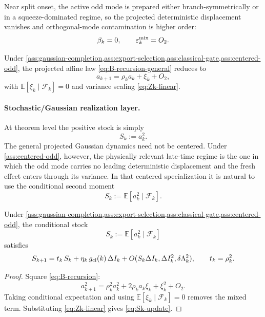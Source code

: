 \begin{assumption}
\label{ass:centered-odd}
Near split onset, the active odd mode is prepared either branch-symmetrically or in a squeeze-dominated regime, so the
projected deterministic displacement vanishes and orthogonal-mode contamination is higher order:
\[
\beta_k=0,
\qquad
\varepsilon_k^{\rm mix}=O_2.
\]
\end{assumption}

\begin{corollary}
\label{cor:centered-odd-mode}
Under
\cref{ass:gaussian-completion,ass:export-selection,ass:classical-gate,ass:centered-odd},
the projected affine law \eqref{eq:B-recursion-general} reduces to
\begin{equation}
a_{k+1}=\rho_k a_k+\xi_k+O_2,
\label{eq:B-recursion}
\end{equation}
with \(\mathbb E[\xi_k\mid\mathcal F_k]=0\) and variance scaling \eqref{eq:Zk-linear}.
\end{corollary}

\paragraph{Stochastic/Gaussian realization layer.}
At theorem level the positive stock is simply
\[
S_k:=a_k^2.
\]
The general projected Gaussian dynamics need not be centered.
Under \cref{ass:centered-odd}, however, the physically relevant late-time regime is the one in which the odd mode carries no
leading deterministic displacement and the fresh effect enters through its variance.
In that centered specialization it is natural to use the conditional second moment
\[
S_k:=\mathbb E[a_k^2\mid\mathcal F_k].
\]

\begin{proposition}
\label{prop:odd-mode-stock}
Under
\cref{ass:gaussian-completion,ass:export-selection,ass:classical-gate,ass:centered-odd},
the conditional stock
\[
S_k:=\mathbb E[a_k^2\mid\mathcal F_k]
\]
satisfies
\begin{equation}
S_{k+1}
=
t_k\,S_k+\eta_k\,g_{\rm cl}(k)\,\Delta I_k
+O(S_k\Delta I_k,\Delta I_k^2,\delta\Lambda_k^2),
\qquad t_k=\rho_k^2.
\label{eq:Sk-update}
\end{equation}
\end{proposition}

\begin{proof}
Square \eqref{eq:B-recursion}:
\[
a_{k+1}^2=\rho_k^2 a_k^2+2\rho_k a_k\xi_k+\xi_k^2+O_2.
\]
Taking conditional expectation and using \(\mathbb E[\xi_k\mid\mathcal F_k]=0\) removes the mixed term.
Substituting \eqref{eq:Zk-linear} gives \eqref{eq:Sk-update}.
\end{proof}

